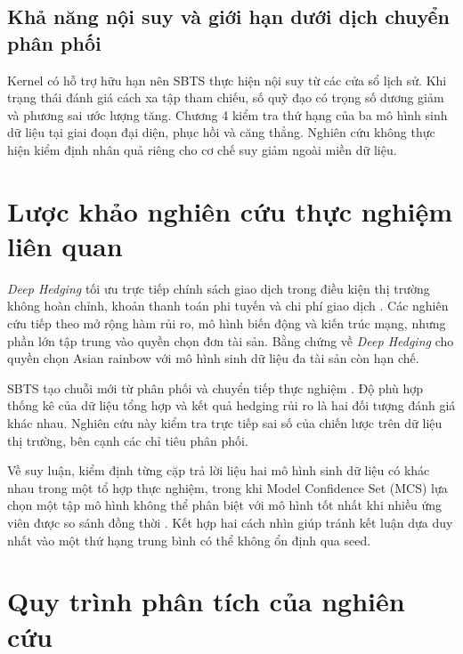 \subsection{Khả năng nội suy và giới hạn dưới dịch chuyển phân phối}

Kernel có hỗ trợ hữu hạn nên SBTS thực hiện nội suy từ các cửa sổ lịch sử. Khi
trạng thái đánh giá cách xa tập tham chiếu, số quỹ đạo có trọng số dương giảm
và phương sai ước lượng tăng. Chương 4 kiểm tra thứ hạng của ba mô hình sinh
dữ liệu tại giai đoạn đại diện, phục hồi và căng thẳng. Nghiên cứu không thực
hiện kiểm định nhân quả riêng cho cơ chế suy giảm ngoài miền dữ liệu.

\section{Lược khảo nghiên cứu thực nghiệm liên quan}
\label{sec:c2-empirical-review}

\textit{Deep Hedging} tối ưu trực tiếp chính sách giao dịch trong điều kiện thị
trường không hoàn chỉnh, khoản thanh toán phi tuyến và chi phí giao dịch
\parencite{Buehler2019}. Các nghiên cứu tiếp theo mở rộng hàm rủi ro, mô hình
biến động và kiến trúc mạng, nhưng phần lớn tập trung vào quyền chọn đơn tài
sản. Bằng chứng về \textit{Deep Hedging} cho quyền chọn Asian rainbow với mô
hình sinh dữ liệu đa tài sản còn hạn chế.

SBTS tạo chuỗi mới từ phân phối và chuyển tiếp thực nghiệm
\parencite{Hamdouche2023}. Độ phù hợp thống kê của dữ liệu tổng hợp và kết quả
hedging rủi ro là hai đối tượng đánh giá khác nhau. Nghiên cứu này kiểm tra
trực tiếp sai số của chiến lược trên dữ liệu thị trường, bên cạnh các chỉ tiêu
phân phối.

Về suy luận, kiểm định từng cặp trả lời liệu hai mô hình sinh dữ liệu có khác nhau trong một
tổ hợp thực nghiệm, trong khi Model Confidence Set (MCS) lựa chọn một tập mô hình
không thể phân biệt với mô hình tốt nhất khi nhiều ứng viên được so sánh đồng
thời \parencite{HansenLundeNason2011}. Kết hợp hai cách nhìn giúp tránh kết
luận dựa duy nhất vào một thứ hạng trung bình có thể không ổn định qua seed.

\section{Quy trình phân tích của nghiên cứu}
\label{sec:c2-framework}

